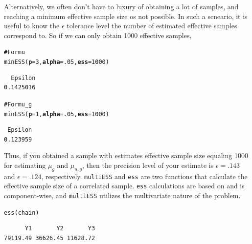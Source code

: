 \documentclass[11pt]{article}\usepackage[]{graphicx}\usepackage[]{color}
\makeatletter
\newcommand{\hlnum}[1]{\textcolor[rgb]{1,0.078,0.576}{#1}}%
\newcommand{\hlcom}[1]{\textcolor[rgb]{0.161,0.161,0.8}{#1}}%
\newcommand{\hlstd}[1]{\textcolor[rgb]{0,0,0}{#1}}%
\newcommand{\hlkwc}[1]{\textcolor[rgb]{0.412,0.412,0.412}{\textbf{#1}}}%
\newcommand{\hlkwd}[1]{\textcolor[rgb]{0,0,0.561}{#1}}%
\newenvironment{kframe}{%
 \def\at@end@of@kframe{}%
 \ifinner\ifhmode%
  \def\at@end@of@kframe{\end{minipage}}%
  \begin{minipage}{\columnwidth}%
 \fi\fi%
 \def\FrameCommand##1{\hskip\@totalleftmargin \hskip-\fboxsep
 \colorbox{shadecolor}{##1}\hskip-\fboxsep
     \hskip-\linewidth \hskip-\@totalleftmargin \hskip\columnwidth}%
 \MakeFramed {\advance\hsize-\width
   \@totalleftmargin\z@ \linewidth\hsize
   \@setminipage}}%
 {\par\unskip\endMakeFramed%
 \at@end@of@kframe}
\newenvironment{knitrout}{}{} %
\makeatother
\begin{document}
Alternatively, we often don't have to luxury of obtaining a lot of samples, and reaching a minimum effective sample size os not possible. In such a scneario, it is useful to know the $\epsilon$ tolerance level the number of estimated effective samples correspond to. So if we can only obtain 1000 effective samples,
\begin{knitrout}
\color{fgcolor}\begin{kframe}
\begin{alltt}
\hlcom{# For mu}
\hlkwd{minESS}\hlstd{(}\hlkwc{p} \hlstd{=} \hlnum{3}\hlstd{,} \hlkwc{alpha} \hlstd{=} \hlnum{.05}\hlstd{,} \hlkwc{ess} \hlstd{=} \hlnum{1000}\hlstd{)}
\end{alltt}
\begin{verbatim}
  Epsilon 
0.1425016 
\end{verbatim}
\begin{alltt}
\hlcom{#For mu_g}
\hlkwd{minESS}\hlstd{(}\hlkwc{p} \hlstd{=} \hlnum{1}\hlstd{,} \hlkwc{alpha} \hlstd{=} \hlnum{.05}\hlstd{,} \hlkwc{ess} \hlstd{=} \hlnum{1000}\hlstd{)}
\end{alltt}
\begin{verbatim}
 Epsilon 
0.123959 
\end{verbatim}
\end{kframe}
\end{knitrout}

Thus, if you obtained a sample with estimates effective sample size equaling 1000 for estimating $\mu_g$ and $\mu_{n,g}$, then the precision level of your estimate is $\epsilon = .143$ and $\epsilon = .124$, respectively.
\texttt{multiESS} and \texttt{ess} are two functions that calculate the effective sample size of a correlated sample. \texttt{ess} calculations are based on \cite{gong2015practical} and is component-wise, and \texttt{multiESS} utilizes the multivariate nature of the problem.

\begin{knitrout}
\color{fgcolor}\begin{kframe}
\begin{alltt}
\hlkwd{ess}\hlstd{(chain)}
\end{alltt}
\begin{verbatim}
      Y1       Y2       Y3 
79119.49 36626.45 11628.72 
\end{verbatim}
\end{kframe}
\end{knitrout}
\end{document}

